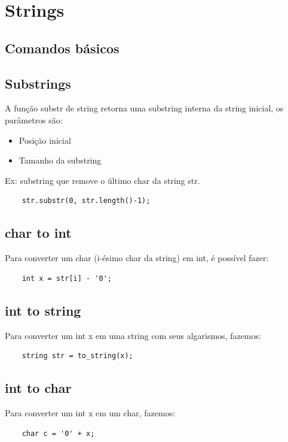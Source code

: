 \section{Strings}

\subsection{Comandos básicos}

\subsection{Substrings}

\par A função substr de string retorna uma substring interna da string inicial, os parâmetros são:
\begin{itemize}
    \item Posição inicial
    \item Tamanho da substring
\end{itemize}
\par Ex: substring que remove o último char da string str.
\begin{verbatim}
    str.substr(0, str.length()-1);
\end{verbatim}

\subsection{char to int}
\par Para converter um char (i-ésimo char da string) em int, é possível fazer:
\begin{verbatim}
    int x = str[i] - '0';
\end{verbatim}

\subsection{int to string}
\par Para converter um int x em uma string com seus algarismos, fazemos:
\begin{verbatim}
    string str = to_string(x);
\end{verbatim}

\subsection{int to char}
\par Para converter um int x em um char, fazemos:
\begin{verbatim}
    char c = '0' + x;
\end{verbatim}

